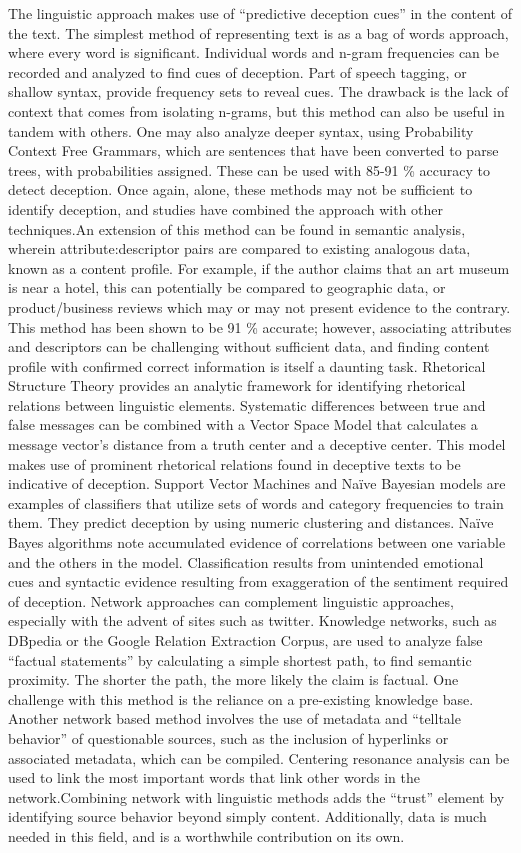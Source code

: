 \documentclass{article}
\begin{document}
The linguistic approach makes use of “predictive deception cues” in the content of the text. The simplest method of representing text is as a bag of words approach, where every word is significant. Individual words and n-gram frequencies can be recorded and analyzed to find cues of deception. Part of speech tagging, or shallow syntax, provide frequency sets to reveal cues. The drawback is the lack of context that comes from isolating n-grams, but this method can also be useful in tandem with others. One may also analyze deeper syntax, using Probability Context Free Grammars, which are sentences that have been converted to parse trees, with probabilities assigned. These can be used with 85-91 \% accuracy to detect deception. Once again, alone, these methods may not be sufficient to identify deception, and studies have combined the approach with other techniques.An extension of this method can be found in semantic analysis, wherein attribute:descriptor pairs are compared to existing analogous data, known as a content profile. For example, if the author claims that an art museum is near a hotel, this can potentially be compared to geographic data, or product/business reviews which may or may not present evidence to the contrary. This method has been shown to be 91 \% accurate; however, associating attributes and descriptors can be challenging without sufficient data, and finding content profile with confirmed correct information is itself a daunting task. Rhetorical Structure Theory provides an analytic framework for identifying rhetorical relations between linguistic elements. Systematic differences between true and false messages can be combined with a Vector Space Model that calculates a message vector’s distance from a truth center and a deceptive center. This model makes use of prominent rhetorical relations found in deceptive texts to be indicative of deception.
Support Vector Machines and Naïve Bayesian models are examples of classifiers that utilize sets of words and category frequencies to train them. They predict deception by using numeric clustering and distances. Naïve Bayes algorithms note accumulated evidence of correlations between one variable and the others in the model. Classification results from unintended emotional cues and syntactic evidence resulting from exaggeration of the sentiment required of deception. Network approaches can complement linguistic approaches, especially with the advent of sites such as twitter. Knowledge networks, such as DBpedia or the Google Relation Extraction Corpus, are used to analyze false “factual statements” by calculating a simple shortest path, to find semantic proximity. The shorter the path, the more likely the claim is factual. One challenge with this method is the reliance on a pre-existing knowledge base. Another network based method involves the use of metadata and “telltale behavior” of questionable sources, such as the inclusion of hyperlinks or associated metadata, which can be compiled. Centering resonance analysis can be used to link the most important words that link other words in the network.Combining network with linguistic methods adds the “trust” element by identifying source behavior beyond simply content. Additionally, data is much needed in this field, and is a worthwhile contribution on its own. \par
\end{document}
